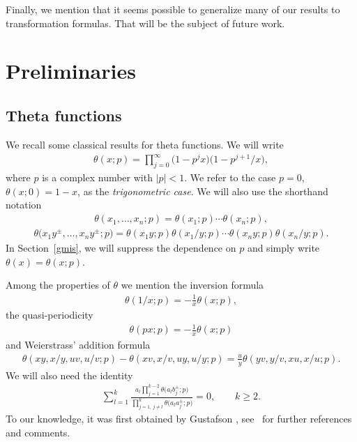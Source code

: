 \documentclass[pdftex]{sigma}%
\numberwithin{equation}{section}
\def\ta{\theta}
\begin{document}
Finally, we mention that it seems
 possible to generalize many of our results to transformation formulas. That will be the subject of future work.\newpage

\section{Preliminaries}

\subsection{Theta functions}

We recall some classical results for theta functions.
We will write
\begin{gather*}
\ta(x;p)=\prod\limits_{j=0}^\infty\big(1-p^jx\big)\big(1-p^{j+1}/x\big),
\end{gather*}
where $p$ is a complex number with $|p|<1$.
We refer to the case
 $p=0$, $\ta(x;0)=1-x$, as the \emph{trigonometric case}.
We will also use the shorthand notation
\begin{gather*}
\theta(x_1,\dots,x_n;p)=\ta(x_1;p)\dotsm\ta(x_n;p),
\end{gather*}
\begin{gather*}
\theta\big(x_1y^{\pm},\dots,x_ny^{\pm};p\big)=\ta(x_1y;p)\ta(x_1/y;p)\dotsm\ta(x_ny;p)
\ta(x_n/y;p).
\end{gather*}
In Section~\ref{gmis}, we will suppress the dependence on $p$ and simply write
$\theta(x)=\theta(x;p)$.


Among the properties of $\theta$ we mention the inversion formula
\begin{gather}
\label{ti}\theta(1/x;p)=-\frac1 x \theta(x;p),
\end{gather}
the quasi-periodicity
\begin{gather}
\label{qpt}\ta(px;p)=-\frac1 x \theta(x;p)
\end{gather}
and Weierstrass' addition formula
\begin{gather}\label{tadd}
\ta(xy,x/y,uv,u/v;p)-\ta(xv,x/v,uy,u/y;p)=\frac uy \ta(yv,y/v,xu,x/u;p).
\end{gather}
We will also need the identity
\begin{gather}\label{cpf}
\sum_{l=1}^k\frac{a_l\prod\limits_{j=1}^{k-2}\theta\big(a_lb_j^\pm;p\big)}
{\prod\limits_{j=1,\,j\neq l}^k\theta\big(a_la_j^\pm;p\big)}=0, \qquad
k\geq 2.
\end{gather}
To our knowledge, it was first obtained by Gustafson
\cite[Lemma~4.14]{gu}, see~\cite{r} for further references and comments.
\end{document}
